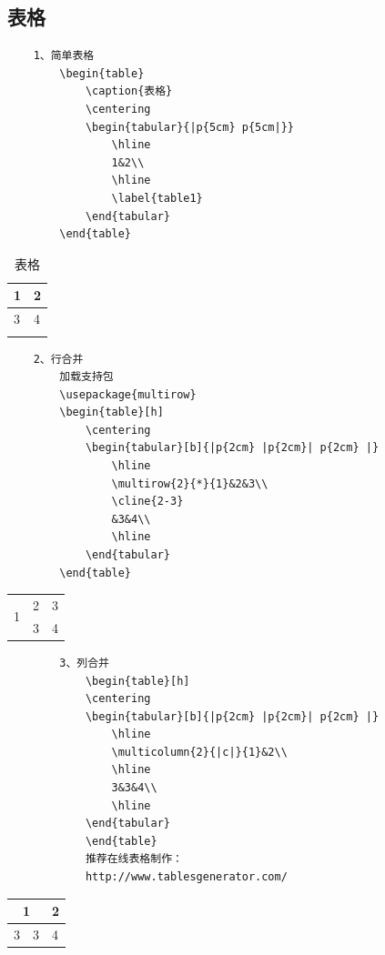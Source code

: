 \documentclass[a4paper]{article}
\begin{document}
	\subsection{表格}
	\begin{lstlisting}
	1、简单表格
		\begin{table}
			\caption{表格}
			\centering
			\begin{tabular}{|p{5cm} p{5cm|}}
				\hline
				1&2\\
				\hline
				\label{table1}
			\end{tabular}
		\end{table}
	\end{lstlisting}
		\begin{table}[htbp]
			\caption{表格}
			\centering
			\begin{tabular}{p{5cm} p{5cm}}
				\hline
				1&2\\
				\hline
				3&4\\
				\hline
				\label{table1}
			\end{tabular}
		\end{table}
	\begin{lstlisting}
	2、行合并
		加载支持包
		\usepackage{multirow}
		\begin{table}[h]
			\centering
			\begin{tabular}[b]{|p{2cm} |p{2cm}| p{2cm} |}
				\hline
				\multirow{2}{*}{1}&2&3\\
				\cline{2-3}
				&3&4\\
				\hline
			\end{tabular}	
		\end{table}
	\end{lstlisting}
		\begin{table}[h]
			\centering
			\begin{tabular}[b]{|p{2cm} |p{2cm}| p{2cm} |}
				\hline
				\multirow{2}{*}{1}&2&3\\
				\cline{2-3}
				&3&4\\
				\hline
			\end{tabular}		
		\end{table}
	\begin{lstlisting}
		3、列合并
			\begin{table}[h]
			\centering
			\begin{tabular}[b]{|p{2cm} |p{2cm}| p{2cm} |}
				\hline
				\multicolumn{2}{|c|}{1}&2\\
				\hline
				3&3&4\\
				\hline
			\end{tabular}		
			\end{table}	
			推荐在线表格制作：
			http://www.tablesgenerator.com/
	\end{lstlisting}
		\begin{table}[h]
		\centering
		\begin{tabular}[b]{|p{2cm} |p{2cm}| p{2cm} |}
			\hline
			\multicolumn{2}{|c|}{1}&2\\
			\hline
			3&3&4\\
			\hline
		\end{tabular}		
	\end{table}	
\end{document}
